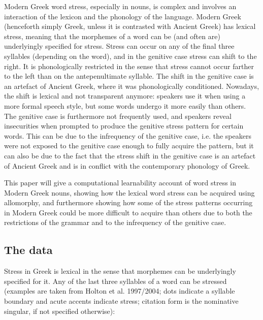 \documentclass[a4paper]{article}
\begin{document}
Modern Greek word stress, especially in nouns, is complex and involves an interaction of the lexicon and the phonology of the language. Modern Greek (henceforth simply Greek, unless it is contrasted with Ancient Greek) has lexical  stress, meaning that the morphemes of a word can be (and often are) underlyingly specified for stress. Stress can occur on any of the final three syllables (depending on the word), and in the genitive case stress can shift to the right. It is phonologically restricted in the sense that stress cannot occur farther to the left than on the antepenultimate syllable. The shift in the genitive case is an artefact of Ancient Greek, where it was phonologically conditioned. Nowadays, the shift is lexical and not transparent anymore: speakers use it when using a more formal speech style, but some words undergo it more easily than others. The genitive case is furthermore not frequently used, and speakers reveal insecurities when prompted to produce the genitive stress pattern for certain words. This can be due to the infrequency of the genitive case, i.e. the speakers were not exposed to the genitive case enough to fully acquire the pattern, but it can also be due to the fact that the stress shift in the genitive case is an artefact of Ancient Greek and is in conflict with the contemporary phonology of Greek.

This paper will give a computational learnability account of word stress in Modern Greek nouns, showing how the lexical word stress can be acquired using allomorphy, and furthermore showing how some of the stress patterns occurring in Modern Greek could be more difficult to acquire than others due to both the restrictions of the grammar and to the infrequency of the genitive case.

\subsection{
The data}

Stress in Greek is lexical in the sense that morphemes can be underlyingly specified for it. Any of the last three syllables of a word can be stressed (examples are taken from Holton et al. 1997/2004; dots indicate a syllable boundary and acute accents indicate stress; citation form is the nominative singular, if not specified otherwise):
\end{document}
